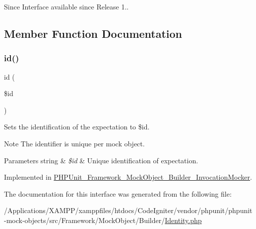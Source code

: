 \begin{DoxySince}{Since}
Interface available since Release 1.. 
\end{DoxySince}


\subsection{Member Function Documentation}
\mbox{\label{interface_p_h_p_unit___framework___mock_object___builder___identity_a6ff64f57bb98d1f8903290a95f22dc43}} 
\subsubsection{\texorpdfstring{id()}{id()}}
{\footnotesize\ttfamily id (\begin{DoxyParamCaption}\item[{}]{\$id }\end{DoxyParamCaption})}

Sets the identification of the expectation to \$id.

\begin{DoxyNote}{Note}
The identifier is unique per mock object.
\end{DoxyNote}

\begin{DoxyParams}[1]{Parameters}
string & {\em \$id} & Unique identification of expectation. \\
\hline
\end{DoxyParams}


Implemented in \mbox{\hyperlink{class_p_h_p_unit___framework___mock_object___builder___invocation_mocker_a6ff64f57bb98d1f8903290a95f22dc43}{P\+H\+P\+Unit\+\_\+\+Framework\+\_\+\+Mock\+Object\+\_\+\+Builder\+\_\+\+Invocation\+Mocker}}.



The documentation for this interface was generated from the following file\+:\begin{DoxyCompactItemize}
\item 
/\+Applications/\+X\+A\+M\+P\+P/xamppfiles/htdocs/\+Code\+Igniter/vendor/phpunit/phpunit-\/mock-\/objects/src/\+Framework/\+Mock\+Object/\+Builder/\mbox{\hyperlink{_identity_8php}{Identity.\+php}}\end{DoxyCompactItemize}
